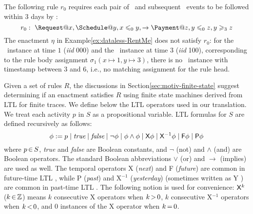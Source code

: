 \begin{examp}
  The following rule $r_0$ requires
  each pair of \Request\ and subsequent \Schedule\ events
  to be followed within 3 days by \Payment:
  \[
  r_{0}:\ \Request@x, \Schedule@y, x\leq_{0}y,
  \rightarrow
  \Payment@z, y\leq_{0} z, y\geq_{3} z
  \]
  The enactment $\eta$ in Example\:\ref{ex:dataless-RentMe}
  does not satisfy $r_{0}$:
  for the \Request\ instance at time $1$ ({\it iid} 000)
  and the \Schedule\ instance at time $3$ ({\it iid} 100),
  corresponding to the rule body assignment $\sigma_1(x \mapsto 1, y\mapsto 3)$,
  there is no \Payment\ instance with timestamp between $3$ and $6$,
  i.e., no matching assignment for the rule head.
\end{examp}
  
Given a set of rules $R$,
the discussions in Section\:\ref{sec:motiv-finite-state} suggest determining
if an enactment satisfies $R$
using finite state machines derived from LTL for finite traces.
We define below the LTL operators used in our translation.
We treat each activity $p$ in $S$
as a propositional variable.
LTL formulas for $S$ are defined recursively as follows:
\[
  \phi := p \mid
  \textit{true} \mid
  \textit{false} \mid
  \neg\phi \mid
  \phi\land\phi \mid
  {\sf X}\phi \mid
  {\sf X}^{-1} \phi \mid
  {\sf F}\phi \mid
  {\sf P} \phi
\]
where $p\,{\in}\, S$,
{\it true} and {\it false} are Boolean constants,
and $\neg$ (not) and $\land$ (and) are Boolean operators.
The standard Boolean abbreviations $\lor$ (or) and $\to$ (implies)
are used as well.
The temporal operators {\sf X} ({\em next}) and {\sf F} ({\em future})
are common in future-time LTL \cite{pnueli1977temporal},
while {\sf P} ({\em past})
and {\sf X}$^{-1}$ ({\em yesterday})
(sometimes written as {\sf Y} \cite{cimatti2004bounded})
are common in past-time LTL \cite{lichtenstein1985glory}.
The following notion is used for convenience:
${\sf X}^{k}$ ($k \,{\in}\, \mathbb{Z}$)
means $k$ consecutive {\sf X} operators when $k\,{>}\,0$, 
$k$ consecutive {\sf X}$^{-1}$ operators when $k\,{<}\,0$,
and 0 instances of the {\sf X} operator when $k\,{=}\,0$.

